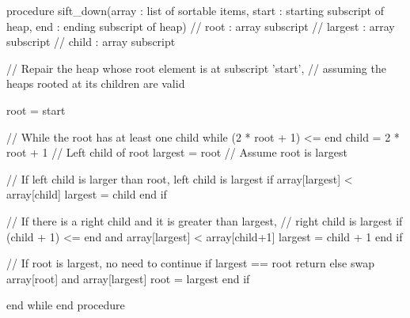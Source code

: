 \documentclass{report}
\begin{document}
    \pagebreak 
    \bigbreak \noindent 
    \begin{cppcode}
procedure sift_down(array : list of sortable items, start : starting
  subscript of heap, end : ending subscript of heap)
    // root : array subscript
    // largest : array subscript
    // child : array subscript

    // Repair the heap whose root element is at subscript 'start',
    // assuming the heaps rooted at its children are valid

    root = start

    // While the root has at least one child
    while (2 * root + 1) <= end
        child = 2 * root + 1 // Left child of root
        largest = root // Assume root is largest

        // If left child is larger than root, left child is largest
        if array[largest] < array[child]
            largest = child
        end if

        // If there is a right child and it is greater than largest,
        // right child is largest
        if (child + 1) <= end and array[largest] < array[child+1]
            largest = child + 1
        end if

        // If root is largest, no need to continue
        if largest == root
            return
        else
            swap array[root] and array[largest]
            root = largest
        end if

    end while
end procedure
    \end{cppcode}

    \pagebreak 
\end{document}
